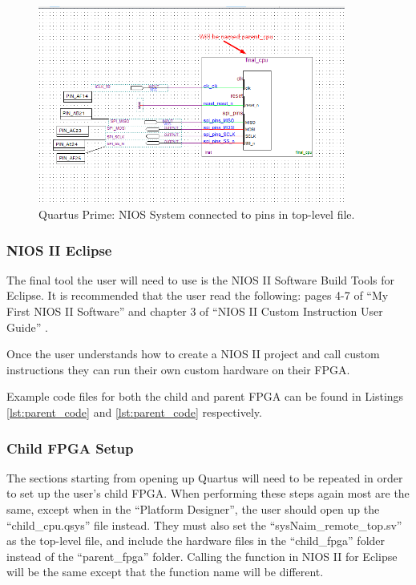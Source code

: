 \begin{figure}[!htb]
    \centering
    \includegraphics[width=0.9\textwidth]{05_evaluation/images/qs_cpu_connected.png}
    \caption{Quartus Prime: NIOS System connected to pins in top-level file.}
    \label{fig:qp_connected}
\end{figure}

\subsubsection{NIOS II Eclipse}

The final tool the user will need to use is the NIOS II Software Build Tools for Eclipse. It is recommended that the user read the following: pages 4-7 of “My First NIOS II Software” \cite{nios-ii-first-prog} and chapter 3 of “NIOS II Custom Instruction User Guide” \cite{nios-ii-inst-guide}.

Once the user understands how to create a NIOS II project and call custom instructions they can run their own custom hardware on their FPGA.

Example code files for both the child and parent FPGA can be found in Listings \ref{lst:parent_code} and \ref{lst:parent_code} respectively.

\subsubsection{Child FPGA Setup}

The sections starting from opening up Quartus will need to be repeated in order to set up the user's child FPGA. When performing these steps again most are the same, except when in the “Platform Designer”, the user should open up the “child\_cpu.qsys” file instead. They must also set the “sysNaim\_remote\_top.sv” as the top-level file, and include the hardware files in the “child\_fpga” folder instead of the “parent\_fpga” folder. Calling the function in NIOS II for Eclipse will be the same except that the function name will be different.

